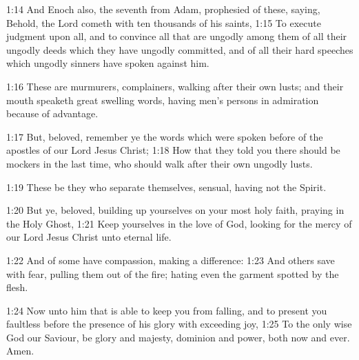 1:14 And Enoch also, the seventh from Adam, prophesied of these,
saying, Behold, the Lord cometh with ten thousands of his saints, 1:15
To execute judgment upon all, and to convince all that are ungodly
among them of all their ungodly deeds which they have ungodly
committed, and of all their hard speeches which ungodly sinners have
spoken against him.

1:16 These are murmurers, complainers, walking after their own lusts;
and their mouth speaketh great swelling words, having men's persons in
admiration because of advantage.

1:17 But, beloved, remember ye the words which were spoken before of
the apostles of our Lord Jesus Christ; 1:18 How that they told you
there should be mockers in the last time, who should walk after their
own ungodly lusts.

1:19 These be they who separate themselves, sensual, having not the
Spirit.

1:20 But ye, beloved, building up yourselves on your most holy faith,
praying in the Holy Ghost, 1:21 Keep yourselves in the love of God,
looking for the mercy of our Lord Jesus Christ unto eternal life.

1:22 And of some have compassion, making a difference: 1:23 And others
save with fear, pulling them out of the fire; hating even the garment
spotted by the flesh.

1:24 Now unto him that is able to keep you from falling, and to
present you faultless before the presence of his glory with exceeding
joy, 1:25 To the only wise God our Saviour, be glory and majesty,
dominion and power, both now and ever. Amen.

